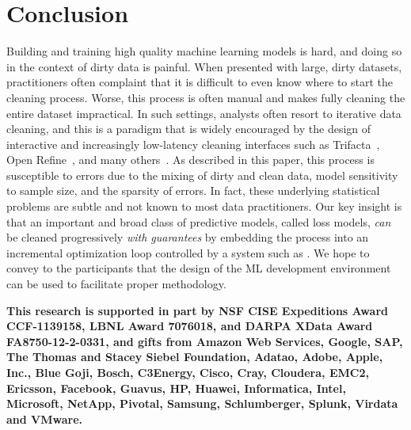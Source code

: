 \vspace{2em}

\section{Conclusion}
Building and training high quality machine learning models is hard, and doing so in the context of dirty data is painful.
When presented with large, dirty datasets, practitioners often complaint that it is difficult to even know where to start the cleaning process.
Worse, this process is often manual and makes fully cleaning the entire dataset impractical.  
In such settings, analysts often resort to iterative data cleaning, and this is a paradigm that is widely encouraged by the design of interactive and increasingly low-latency cleaning interfaces such as Trifacta~\cite{trifacta}, Open Refine~\cite{openrefine}, and many others~\cite{talend,informatica,chen2014integrating}.
As described in this paper, this process is susceptible to errors due to the mixing of dirty and clean data, model sensitivity to sample size, and the sparsity of errors.
In fact, these underlying statistical problems are subtle and not known to most data practitioners.
Our key insight is that an important and broad class of predictive models, called loss models, 
{\it can} be cleaned progressively {\it with guarantees} by embedding the process into an incremental optimization loop controlled by a system such as \sys.
We hope to convey to the participants that the design of the ML development environment can be used to facilitate proper methodology.

\vspace{0.5em}

\textbf{\scriptsize This research is supported in part by NSF CISE Expeditions Award CCF-1139158, LBNL Award 7076018, and DARPA XData Award FA8750-12-2-0331, and gifts from Amazon Web Services, Google, SAP, The Thomas and Stacey Siebel Foundation, Adatao, Adobe, Apple, Inc., Blue Goji, Bosch, C3Energy, Cisco, Cray, Cloudera, EMC2, Ericsson, Facebook, Guavus, HP, Huawei, Informatica, Intel, Microsoft, NetApp, Pivotal, Samsung, Schlumberger, Splunk, Virdata and VMware.}
